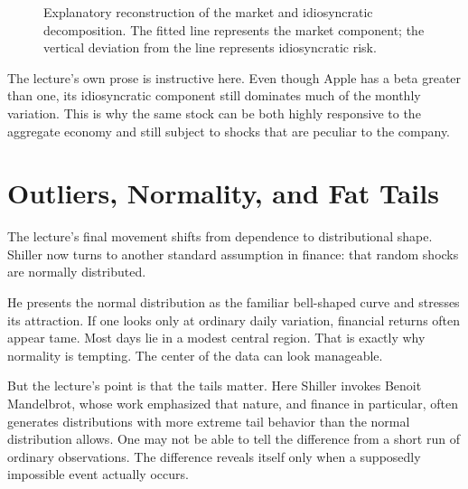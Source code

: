 \begin{figure}[htbp]
\centering
{}
\caption{Explanatory reconstruction of the market and idiosyncratic decomposition. The fitted line represents the market component; the vertical deviation from the line represents idiosyncratic risk.}
\end{figure}

The lecture's own prose is instructive here. Even though Apple has a beta greater than one, its idiosyncratic component still dominates much of the monthly variation. This is why the same stock can be both highly responsive to the aggregate economy and still subject to shocks that are peculiar to the company.

\section{Outliers, Normality, and Fat Tails}

The lecture's final movement shifts from dependence to distributional shape. Shiller now turns to another standard assumption in finance: that random shocks are normally distributed.

He presents the normal distribution as the familiar bell-shaped curve and stresses its attraction. If one looks only at ordinary daily variation, financial returns often appear tame. Most days lie in a modest central region. That is exactly why normality is tempting. The center of the data can look manageable.

But the lecture's point is that the tails matter. Here Shiller invokes Benoit Mandelbrot, whose work emphasized that nature, and finance in particular, often generates distributions with more extreme tail behavior than the normal distribution allows. One may not be able to tell the difference from a short run of ordinary observations. The difference reveals itself only when a supposedly impossible event actually occurs.

